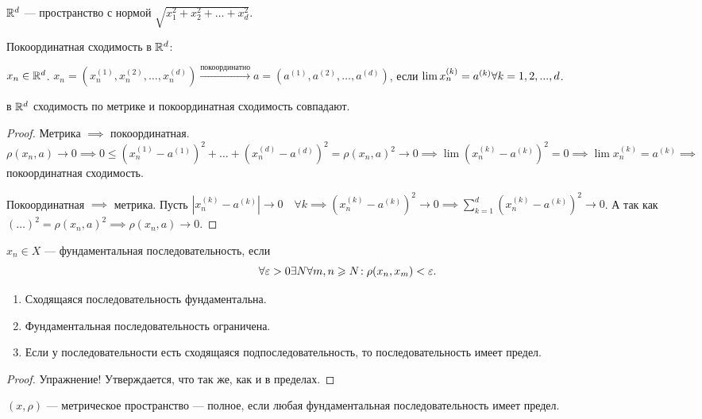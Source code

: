 \begin{definition}
    $\mathbb{R}^d$ --- пространство с нормой  $\sqrt{x_1^2 + x_2^2 + \ldots + x_d^2}$.
\end{definition}
\begin{definition}
    Покоординатная сходимость в $\mathbb{R}^d$:

    $x_n \in \mathbb{R}^d$.  $x_n = (x_n^{(1)}, x_n^{(2)}, \ldots, x_n^{(d)}) \xrightarrow{\text{покоординатно}} a = (a^{(1)}, a^{(2)}, \ldots, a^{(d)})$, если $\lim x_n^{(k)} = a^{(k)}\\ \forall k = 1, 2, ..., d$.
\end{definition}
\begin{theorem}
    в $\mathbb{R}^d$ сходимость по метрике и покоординатная сходимость совпадают.
\end{theorem}
\begin{proof}
    Метрика $\implies$ покоординатная.  $\rho(x_n, a) \to 0 \implies 0 \le (x_n^{(1)} - a^{(1)})^2 + \ldots + (x_n^{(d)} - a^{(d)})^2 = \rho(x_n, a)^2 \to 0 \implies \lim (x_n^{(k)} - a^{(k)})^2 = 0 \implies \lim x_n^{(k)} = a^{(k)} \implies$ покоординатная сходимость.

    Покоординатная $\implies$ метрика. Пусть  $|x_n^{(k)} - a^{(k)}| \to 0 \quad \forall k \implies (x_n^{(k)} - a^{(k)})^2 \to 0 \implies \sum\limits_{k=1}^d (x_n^{(k)} - a^{(k)})^2 \to 0$. А так как $(\ldots)^2 = \rho(x_n, a)^2 \implies \rho(x_n, a) \to 0$.
\end{proof}
\begin{definition}
    $x_n \in X$ --- фундаментальная последовательность, если
     \[
    \forall \varepsilon > 0 \exists N \forall m, n \geqslant N\!: \rho(x_n, x_m) < \varepsilon
    .\] 
\end{definition}
\begin{properties}
    \begin{enumerate}
        \item Сходящаяся последовательность фундаментальна.
        \item Фундаментальная последовательность ограничена.
        \item Если у последовательности есть сходящаяся подпоследовательность, то последовательность имеет предел.
    \end{enumerate}
\end{properties}
\begin{proof}
    Упражнение! Утверждается, что так же, как и в пределах.
\end{proof}
\begin{definition}
    $(x, \rho)$ --- метрическое пространство --- полное, если любая фундаментальная последовательность имеет предел.
\end{definition}
